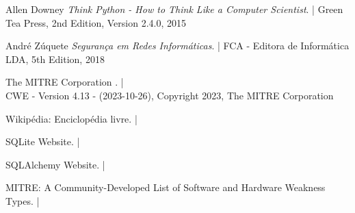 %
%
\begin{thebibliography}{9}

Allen Downey
\textit{Think Python - How to Think Like a Computer Scientist}. |
Green Tea Press, 2nd Edition, Version 2.4.0, 2015

André Zúquete
\textit{Segurança em Redes Informáticas}. |
FCA - Editora de Informática LDA, 5th Edition, 2018

The MITRE Corporation
. | \\
CWE - Version 4.13 - (2023-10-26), Copyright 2023, The MITRE Corporation

Wikipédia: Enciclopédia livre. |

SQLite Website. |

SQLAlchemy Website. |

MITRE: A Community-Developed List of Software and Hardware Weakness Types. |

\end{thebibliography}
